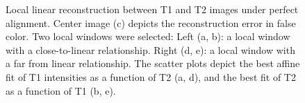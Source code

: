 \begin{figure}[t!]
    \caption{{\small Local linear reconstruction between T1 and T2 images under perfect alignment. Center image (c) depicts the reconstruction error in false color. Two local windows were selected: Left (a, b): a local window with a close-to-linear relationship. Right (d, e): a local window with a far from linear relationship. The scatter plots depict the best affine fit of T1 intensities as a function of T2 (a, d), and the best fit of T2 as a function of T1 (b, e).}}
\label{fig:llr_test}\figcloser
\end{figure}





